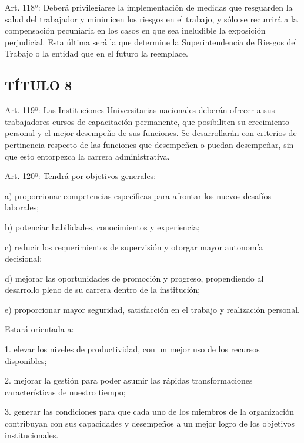 \documentclass[]{article}
\begin{document}
Art. 118º: Deberá privilegiarse la implementación de medidas que
resguarden la salud del trabajador y minimicen los riesgos en el
trabajo, y sólo se recurrirá a la compensación pecuniaria en los casos
en que sea ineludible la exposición perjudicial. Esta última será la que
determine la Superintendencia de Riesgos del Trabajo o la entidad que en
el futuro la reemplace.

\subsection{TÍTULO 8}\label{tuxedtulo-8}


Art. 119º: Las Instituciones Universitarias nacionales deberán ofrecer a
sus trabajadores cursos de capacitación permanente, que posibiliten su
crecimiento personal y el mejor desempeño de sus funciones. Se
desarrollarán con criterios de pertinencia respecto de las funciones que
desempeñen o puedan desempeñar, sin que esto entorpezca la carrera
administrativa.

Art. 120º: Tendrá por objetivos generales:

a) proporcionar competencias específicas para afrontar los nuevos
desafíos laborales;

b) potenciar habilidades, conocimientos y experiencia;

c) reducir los requerimientos de supervisión y otorgar mayor autonomía
decisional;

d) mejorar las oportunidades de promoción y progreso, propendiendo al
desarrollo pleno de su carrera dentro de la institución;

e) proporcionar mayor seguridad, satisfacción en el trabajo y
realización personal.

Estará orientada a:

1. elevar los niveles de productividad, con un mejor uso de los recursos
disponibles;

2. mejorar la gestión para poder asumir las rápidas transformaciones
características de nuestro tiempo;

3. generar las condiciones para que cada uno de los miembros de la
organización contribuyan con sus capacidades y desempeños a un mejor
logro de los objetivos institucionales.
\end{document}
